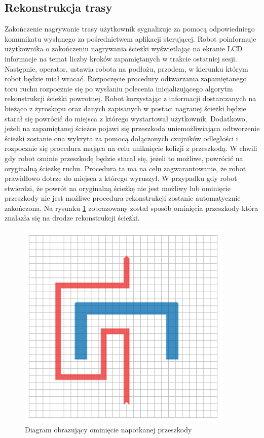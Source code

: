 \subsection{Rekonstrukcja trasy}
Zakończenie nagrywanie trasy użytkownik sygnalizuje za pomocą odpowiedniego
komunikatu wysłanego za pośrednictwem aplikacji sterującej. Robot
poinformuje użytkownika o zakończeniu nagrywania ścieżki wyświetlając na ekranie
LCD informacje na temat liczby kroków zapamiętanych w trakcie ostatniej sesji.
Następnie, operator, ustawia robota na podłożu, przodem, w kierunku którym robot
będzie miał wracać. Rozpoczęcie procedury odtwarzania zapamiętanego toru ruchu
rozpocznie się po wysłaniu polecenia inicjalizującego algorytm rekonstrukcji
ścieżki powrotnej. Robot korzystając z informacji dostarczanych na bieżąco z
żyroskopu oraz danych zapisanych w postaci nagranej ścieżki będzie starał się
powrócić do miejsca z którego wystartował użytkownik. Dodatkowo, jeżeli na
zapamiętanej ścieżce pojawi się przeszkoda uniemożliwiająca odtworzenie ścieżki
zostanie ona wykryta za pomocą dołączonych czujników odległości i rozpocznie się
procedura mająca na celu uniknięcie kolizji z przeszkodą. W chwili gdy robot
ominie przeszkodę będzie starał się, jeżeli to możliwe, powrócić na oryginalną
ścieżkę ruchu. Procedura ta ma na celu zagwarantowanie, że robot prawidłowo
dotrze do miejsca z którego wyruszył. W przypadku gdy robot stwierdzi, że powrót
na oryginalną ścieżkę nie jest możliwy lub ominięcie przeszkody nie jest możliwe
procedura rekonstrukcji zostanie automatycznie zakończona. Na rysunku
\ref{fig:rtrwca_avoid_obstacle} zobrazowany został sposób ominięcia przeszkody która znalazła się
na drodze rekonstrukcji ścieżki. 

\begin{figure}[ht!]
 \centering \includegraphics[height=100mm]{../images/ch04/rtrwca1.png}
 \caption{Diagram obrazujący ominięcie napotkanej przeszkody}
 \label{fig:rtrwca_avoid_obstacle}
\end{figure}

